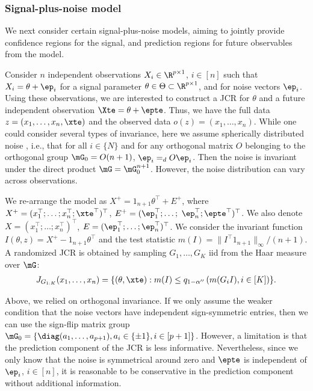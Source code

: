 \documentclass[english]{article}
\begin{document}
\subsubsection{Signal-plus-noise model}
We next consider certain signal-plus-noise models, aiming to jointly provide confidence regions for the signal, 
and prediction regions for future observables from the model.
\begin{example}\label{example-spn}
  Consider
  $n$ independent observations $X_i \in \R^{p \times 1}$, $i\in [n]$ such that $X_i = \theta + \ep_i$ for a signal parameter $\theta \in \Theta\subset \R^{p \times 1}$, and for noise vectors $\ep_i$.
  Using these observations, we are interested to construct a JCR for $\theta$ and a future independent observation $\Xte = \theta + \epte$.
  Thus, 
  we have the full data $z=(x_1,\ldots,x_n,\xte)$ and the observed data $o(z)= (x_1,\ldots,x_n)$. 
  While one could consider several types of invariance, here 
  we assume spherically distributed noise \citep{kai1990generalized,gupta2012elliptically,fang2018symmetric}, 
  i.e., that 
   for all $i\in \{N\}$ and
  for any orthogonal matrix $O$ belonging to the orthogonal group $\mG_0 = O(n+1)$,
  $\ep_i =_d O \ep_i$.
  Then the noise is invariant under the direct product $\mG = \mG_0^{n+1}$.
  However, the noise distribution can vary across observations.

  We re-arrange the model as $X^+ = 1_{n+1}\theta^\top + E^+$, where $X^+=(x_1^\top;\ldots;x_n^\top;\xte^\top)^\top$, $E^+=(\ep_1^\top;\ldots;$ $\ep_n^\top;\epte^\top)^\top$. We also denote $X=(x_1^\top;\ldots;x_n^\top)^\top$, $E=(\ep_1^\top;\ldots;\ep_n^\top)^\top$.
    We consider 
    the invariant function
    $I(\theta,z) = X^+ - 1_{n+1}\theta^\top$
    and the
    test statistic $m(I) = \| I^\top 1_{n+1}\|_\infty/(n+1)$.
    A randomized JCR is obtained by sampling $G_1,\ldots, G_K$ iid from the Haar measure over $\mG$:
       \begin{align*}
        J_{G_{1:K}}(x_1,\ldots,x_n) = \{(\theta,\xte): m(I) \leq q_{1-\alpha''}\left(m(G_iI), i\in[K] \right)  \}.
    \end{align*}

\end{example}

Above, we relied on  orthogonal invariance. 
If we only assume the weaker condition
that the noise vectors have independent sign-symmetric entries, 
then we can use the sign-flip matrix group $\mG_0 = \{\diag(a_1, \ldots, a_{p+1}), a_i\in \{\pm 1\}, i\in [p+1]\}$. 
However, a limitation is that
the prediction component of the JCR is less informative. 
Nevertheless, since we only know that the noise is symmetrical around zero and $\epte$ is independent of $\ep_i$, $i\in [n]$, it is reasonable to be conservative in the prediction component without additional information.
\end{document}
